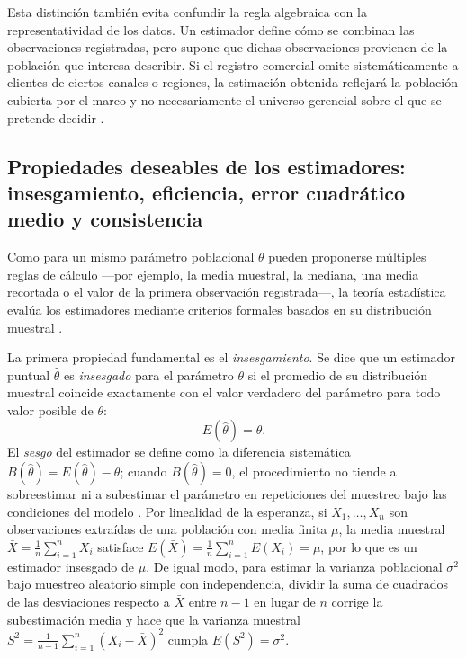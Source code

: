 {Esta distinción también evita confundir la regla algebraica con la representatividad de los datos. Un estimador define cómo se combinan las observaciones registradas, pero supone que dichas observaciones provienen de la población que interesa describir. Si el registro comercial omite sistemáticamente a clientes de ciertos canales o regiones, la estimación obtenida reflejará la población cubierta por el marco y no necesariamente el universo gerencial sobre el que se pretende decidir \citep{bradley2021}.

\subsection{Propiedades deseables de los estimadores: insesgamiento, eficiencia, error cuadrático medio y consistencia}
Como para un mismo parámetro poblacional $\theta$ pueden proponerse múltiples reglas de cálculo —por ejemplo, la media muestral, la mediana, una media recortada o el valor de la primera observación registrada—, la teoría estadística evalúa los estimadores mediante criterios formales basados en su distribución muestral \citep[cap.~8]{wackerly2010}.

La primera propiedad fundamental es el \textit{insesgamiento}. Se dice que un estimador puntual $\hat{\theta}$ es \textit{insesgado} para el parámetro $\theta$ si el promedio de su distribución muestral coincide exactamente con el valor verdadero del parámetro para todo valor posible de $\theta$:
\[
  E(\hat{\theta}) = \theta.
\]
El \textit{sesgo} del estimador se define como la diferencia sistemática $B(\hat{\theta}) = E(\hat{\theta}) - \theta$; cuando $B(\hat{\theta})=0$, el procedimiento no tiende a sobreestimar ni a subestimar el parámetro en repeticiones del muestreo bajo las condiciones del modelo \citep[sec.~8.2]{wackerly2010}. Por linealidad de la esperanza, si $X_1, \dots, X_n$ son observaciones extraídas de una población con media finita $\mu$, la media muestral $\bar{X} = \frac{1}{n}\sum_{i=1}^n X_i$ satisface $E(\bar{X}) = \frac{1}{n}\sum_{i=1}^n E(X_i) = \mu$, por lo que es un estimador insesgado de $\mu$. De igual modo, para estimar la varianza poblacional $\sigma^2$ bajo muestreo aleatorio simple con independencia, dividir la suma de cuadrados de las desviaciones respecto a $\bar{X}$ entre $n-1$ en lugar de $n$ corrige la subestimación media y hace que la varianza muestral $S^2 = \frac{1}{n-1}\sum_{i=1}^n (X_i - \bar{X})^2$ cumpla $E(S^2) = \sigma^2$.

}
